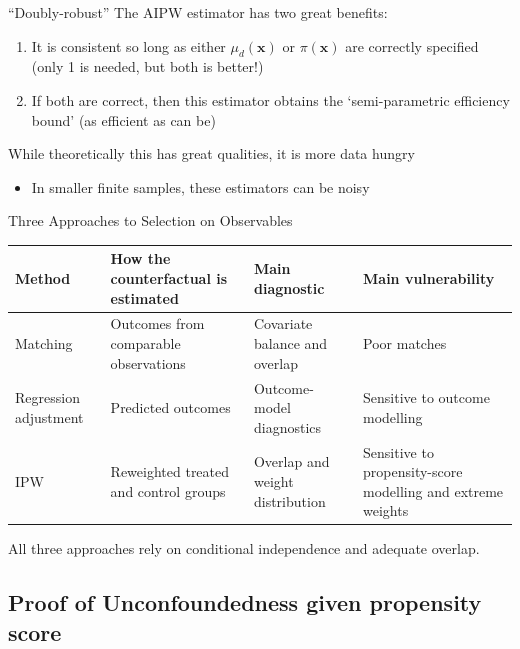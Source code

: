 \documentclass[aspectratio=169,t,11pt,table]{beamer}
\begin{document}
\begin{frame}{``Doubly-robust''}
  The AIPW estimator has two great benefits:
  \begin{enumerate}
    \item It is consistent so long as either $\mu_d(\bm{x})$ or $\pi(\bm{x})$ are correctly specified (only 1 is needed, but both is better!)
    
    \pause
    \item If both are correct, then this estimator obtains the `semi-parametric efficiency bound' (as efficient as can be)
  \end{enumerate}

  \pause
  \bigskip
  While theoretically this has great qualities, it is more data hungry
  \begin{itemize}
    \item In smaller finite samples, these estimators can be noisy
  \end{itemize}
\end{frame}

\begin{frame}{Three Approaches to Selection on Observables}
  \footnotesize
  \renewcommand{\arraystretch}{1.35}
  \begin{tabularx}{\textwidth}{@{}>{\raggedright\arraybackslash}p{2.1cm} >{\raggedright\arraybackslash}X >{\raggedright\arraybackslash}p{3.0cm} >{\raggedright\arraybackslash}p{3.55cm}@{}}
    \toprule
    \textbf{Method} & \textbf{How the counterfactual is estimated} & \textbf{Main diagnostic} & \textbf{Main vulnerability} \\
    \midrule
    Matching & Outcomes from comparable observations & Covariate balance and overlap & Poor matches \\
    Regression adjustment & Predicted outcomes & Outcome-model diagnostics & Sensitive to outcome modelling \\
    IPW & Reweighted treated and control groups & Overlap and weight distribution & Sensitive to propensity-score modelling and extreme weights \\
    \bottomrule
  \end{tabularx}

  \bigskip
  \begin{center}
    All three approaches rely on conditional independence and adequate overlap.
  \end{center}
\end{frame}

\appendix

\subsection{Proof of Unconfoundedness given propensity score}
\end{document}

